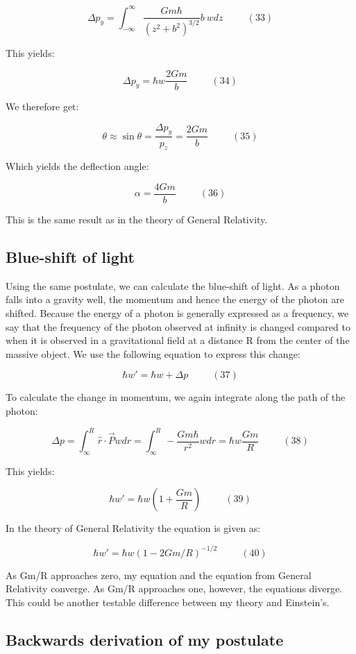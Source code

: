 \documentclass {article}
\begin{document}
$$\Delta p_y = \int_{-\infty}^{\infty}  \frac {Gm\hbar}{(z^2 + b^2)^{3/2}} b ~ wdz ~~~~~~~~~~~ (33)$$

This yields:

$$\Delta p_y = \hbar w \frac {2Gm} b ~~~~~~~~~~~ (34)$$

We therefore get:

$$\theta \approx \sin \theta = \frac {\Delta p_y}{p_z} = \frac {2Gm} b ~~~~~~~~~~~ (35)$$

Which yields the deflection angle:

$$\alpha = \frac {4Gm} b ~~~~~~~~~~~ (36)$$

This is the same result as in the theory of General Relativity.

\subsection{Blue-shift of light }

Using the same postulate, we can calculate the blue-shift of light. As a photon falls into a gravity well, the momentum and hence the energy of the photon are shifted. Because the energy of a photon is generally expressed as a frequency, we say that the frequency of the photon observed at infinity is changed compared to when it is observed in a gravitational field at a distance R from the center of the massive object. We use the following equation to express this change:

$$\hbar w' = \hbar w + \Delta p ~~~~~~~~~~~ (37)$$

To calculate the change in momentum, we again integrate along the path of the photon:

$$\Delta p = \int_{\infty}^R \hat r \cdot \vec P w dr= \int_{\infty}^R - \frac {Gm\hbar}{r^2} w dr = \hbar w \frac {Gm}R ~~~~~~~~~~~ (38)$$

This yields:

$$\hbar w' = \hbar w \left( 1 + \frac {Gm}R \right) ~~~~~~~~~~~ (39)$$

In the theory of General Relativity the equation is given as: 

$$\hbar w ' = \hbar w (1 - 2Gm/R)^{-1/2} ~~~~~~~~~~~ (40)$$

As Gm/R approaches zero, my equation and the equation from General Relativity converge.  As Gm/R approaches one, however, the equations diverge.  This could be another testable difference between my theory and Einstein's.

\subsection{Backwards derivation of my postulate}
\end{document}
